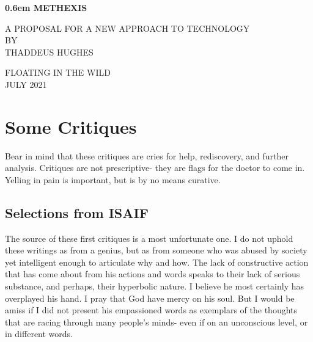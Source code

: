 \documentclass[10pt,letterpaper,openany]{book}
\begin{document}
\clearpage
\newcommand\nbvspace[1][3]{\vspace*{\stretch{#1}}}
\newcommand\nbstretchyspace{\spaceskip0.5em plus 0.25em minus 0.25em}
\newcommand{\nbtitlestretch}{\spaceskip0.6em}
\pagestyle{plain}
\begin{center}
  \bfseries
  \nbvspace[1]
  \Huge
  {\nbtitlestretch\huge
    METHEXIS}

  \nbvspace[1]
  \normalsize
  A PROPOSAL FOR A NEW APPROACH TO TECHNOLOGY\\
  
  \nbvspace[1]
  \small BY\\
  \Large THADDEUS HUGHES\\

  \nbvspace[2]

  \nbvspace[3]
  \normalsize

  \large
  FLOATING IN THE WILD \\
  \small JULY 2021 \\
\end{center}

\raggedbottom

\section{Some Critiques}

Bear in mind that these critiques are cries for help, rediscovery, and further analysis. Critiques are not prescriptive- they are flags for the doctor to come in. Yelling in pain is important, but is by no means curative.


\subsection{Selections from ISAIF}

The source of these first critiques is a most unfortunate one. I do not uphold these writings as from a genius, but as from someone who was abused by society yet intelligent enough to articulate why and how. The lack of constructive action that has come about from his actions and words speaks to their lack of serious substance, and perhaps, their hyperbolic nature. I believe he most certainly has overplayed his hand. I pray that God have mercy on his soul. But I would be amiss if I did not present his empassioned words as exemplars of the thoughts that are racing through many people's minds- even if on an unconscious level, or in different words.
\end{document}
